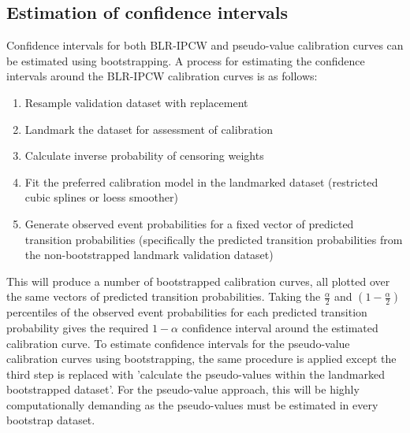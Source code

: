 \documentclass[article,shortnames]{jss}
\begin{document}
\subsection{Estimation of confidence intervals} \label{sec:ci}

Confidence intervals for both BLR-IPCW and pseudo-value calibration curves can be estimated using bootstrapping. A process for estimating the confidence intervals around the BLR-IPCW calibration curves is as follows:

\begin{enumerate}
 \item Resample validation dataset with replacement
 \item Landmark the dataset for assessment of calibration
 \item Calculate inverse probability of censoring weights
 \item Fit the preferred calibration model in the landmarked dataset (restricted cubic splines or loess smoother)
 \item Generate observed event probabilities for a fixed vector of predicted transition probabilities (specifically the predicted transition probabilities from the non-bootstrapped landmark validation dataset)
\end{enumerate}

This will produce a number of bootstrapped calibration curves, all plotted over the same vectors of predicted transition probabilities. Taking the $\frac{\alpha}{2}$ and $\left(1-\frac{\alpha}{2}\right)$ percentiles of the observed event probabilities for each predicted transition probability gives the required $1-\alpha$ confidence interval around the estimated calibration curve. To estimate confidence intervals for the pseudo-value calibration curves using bootstrapping, the same procedure is applied except the third step is replaced with 'calculate the pseudo-values within the landmarked bootstrapped dataset'. For the pseudo-value approach, this will be highly computationally demanding as the pseudo-values must be estimated in every bootstrap dataset.
\end{document}
